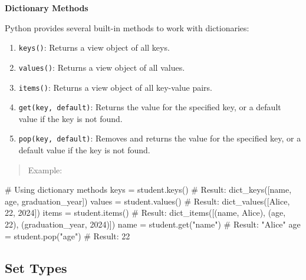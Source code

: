 \documentclass[
  letterpaper,
  DIV=11,
  numbers=noendperiod]{scrreprt}
\newenvironment{Shaded}{\begin{snugshade}}{\end{snugshade}}
\newcommand{\CommentTok}[1]{\textcolor[rgb]{0.37,0.37,0.37}{#1}}
\newcommand{\NormalTok}[1]{\textcolor[rgb]{0.00,0.23,0.31}{#1}}
\newcommand{\OperatorTok}[1]{\textcolor[rgb]{0.37,0.37,0.37}{#1}}
\newcommand{\StringTok}[1]{\textcolor[rgb]{0.13,0.47,0.30}{#1}}
\providecommand{\tightlist}{%
  \setlength{\itemsep}{0pt}\setlength{\parskip}{0pt}}\usepackage{longtable,booktabs,array}
\theoremstyle{plain}
\theoremstyle{definition}
\theoremstyle{remark}
\begin{document}
\textbf{Dictionary Methods}

Python provides several built-in methods to work with dictionaries:

\begin{enumerate}
\def\labelenumi{\arabic{enumi}.}
\tightlist
\item
  \texttt{keys()}: Returns a view object of all keys.
\item
  \texttt{values()}: Returns a view object of all values.
\item
  \texttt{items()}: Returns a view object of all key-value pairs.
\item
  \texttt{get(key,\ default)}: Returns the value for the specified key,
  or a default value if the key is not found.
\item
  \texttt{pop(key,\ default)}: Removes and returns the value for the
  specified key, or a default value if the key is not found.
\end{enumerate}

\begin{quote}
Example:
\end{quote}

\begin{Shaded}
\begin{Highlighting}[]
\CommentTok{\# Using dictionary methods}
\NormalTok{keys }\OperatorTok{=}\NormalTok{ student.keys()        }\CommentTok{\# Result: dict\_keys([\textquotesingle{}name\textquotesingle{}, \textquotesingle{}age\textquotesingle{}, \textquotesingle{}graduation\_year\textquotesingle{}])}
\NormalTok{values }\OperatorTok{=}\NormalTok{ student.values()    }\CommentTok{\# Result: dict\_values([\textquotesingle{}Alice\textquotesingle{}, 22, 2024])}
\NormalTok{items }\OperatorTok{=}\NormalTok{ student.items()      }\CommentTok{\# Result: dict\_items([(\textquotesingle{}name\textquotesingle{}, \textquotesingle{}Alice\textquotesingle{}), (\textquotesingle{}age\textquotesingle{}, 22), (\textquotesingle{}graduation\_year\textquotesingle{}, 2024)])}
\NormalTok{name }\OperatorTok{=}\NormalTok{ student.get(}\StringTok{"name"}\NormalTok{)  }\CommentTok{\# Result: "Alice"}
\NormalTok{age }\OperatorTok{=}\NormalTok{ student.pop(}\StringTok{"age"}\NormalTok{)    }\CommentTok{\# Result: 22}
\end{Highlighting}
\end{Shaded}

\subsection{Set Types}\label{set-types}
\end{document}
